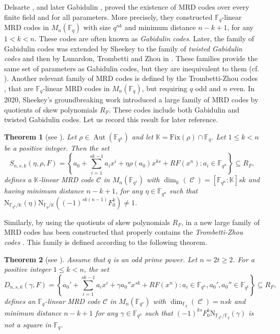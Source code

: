 \documentclass[a4paper, 11pt]{article}
\DeclareMathOperator{\C}{\mathcal{C}}
\DeclareMathOperator{\Aut}{Aut}
\newtheorem{theorem}{Theorem}[section]
\newcommand{\fqn}{\mathbb{F}_{q^n}}
\newcommand{\F}{{\mathbb F}}
\newcommand{\K}{{\mathbb K}}
\newcommand{\fq}{{\mathbb F}_{q}}
\newcommand{\N}{\mathrm{N}}
\begin{document}
Delsarte \cite{delsarte1978bilinear}, and later Gabidulin \cite{gabidulin1985theory}, proved the existence of MRD codes over every finite field and for all parameters. More precisely, they constructed $\F_q$-linear MRD codes in $M_n(\F_q)$ with size $q^{nk}$ and minimum distance $n-k+1$, for any $1< k<n$. These codes are often known as \emph{Gabidulin codes}. Later, the family of Gabidulin codes was extended by Sheekey to the family of \emph{twisted Gabidulin codes} and then by Lunardon, Trombetti and Zhou in \cite{lunardon2018generalized}. These families provide the same set of parameters as Gabidulin codes, but they are inequivalent to them (cf. \cite[Theorem 7]{sheekey2016new}). Another relevant family of MRD codes is defined by the Trombetti-Zhou codes \cite{trombetti2018new}, that are $\F_q$-linear MRD codes in $M_n(\F_q)$,
but requiring $q$ odd and $n$ even. In 2020, Sheekey's groundbreaking work \cite{sheekey2020new} introduced a large family of MRD codes by quotients of skew polynomials $R_F$. These codes include both Gabidulin and twisted Gabidulin codes. Let us record this result for later reference.



\begin{theorem} [see \textnormal{\cite[Theorem 7]{sheekey2020new}}]
Let $\rho \in \Aut(\fqn)$ and let $\K=\mathrm{Fix}(\rho) \cap \fq$. Let $1\leq k < n$ be a positive integer. Then the set 
\begin{equation} \label{eq:johncodes}
S_{n,s,k}(\eta,\rho,F)=\left\{a_0+\sum_{i=1}^{sk-1}a_ix^i+\eta \rho(a_0)x^{ks} +RF(x^n) \colon a_i \in \fqn  \right\} \subseteq R_F,
\end{equation}
defines a $\K$-linear MRD code \(\mathcal{C}\) in $M_n(\F_{q^s})$ with $\dim_{\K}(\C)=[\F_{q^n}:\K]sk$ and having minimum distance $n-k+1$, for any $\eta \in \fqn$ such that $\N_{\fqn/\K}(\eta) \N_{\fq/\K}((-1)^{sk(n-1)}F_0^k) \neq 1$.
\end{theorem}


Similarly, by using the quotients of skew polynomials $R_F$, in \cite{lobillo2025quotients} a new large family of MRD codes has been constructed that properly contains the \emph{Trombetti-Zhou codes} \cite{trombetti2018new}. This family is defined according to the following theorem. 

\begin{theorem} [see \textnormal{\cite[Theorem 6.1.]{lobillo2025quotients}}]
Assume that $q$ is an odd prime power. Let $n=2t \geq 2$. For a positive integer $1\leq k<n$, the set
\begin{equation} \label{eq:finiteextensiontrombzhou}
D_{n,s,k}(\gamma,F)=\left\{ a_0'+\sum_{i=1}^{sk-1} a_i x^i + \gamma a_0'' x^{sk} +RF(x^n) \colon a_i \in \F_{q^n}, a_0',a_0'' \in \F_{q^t} \right\} \subseteq R_F,
\end{equation}
defines an $\F_q$-linear MRD code \(\mathcal{C}\) in $ M_{n}(\F_{q^s})$ with $\dim_{\F_q}(\C)=nsk$ and minimum distance $n-k+1$ for any $\gamma \in \F_{q^n}$ such that $(-1)^{ks}F_0^{k}\N_{\F_{q^n}/\F_q}(\gamma)$ is not a square in $\F_q$.
\end{theorem}
\end{document}
